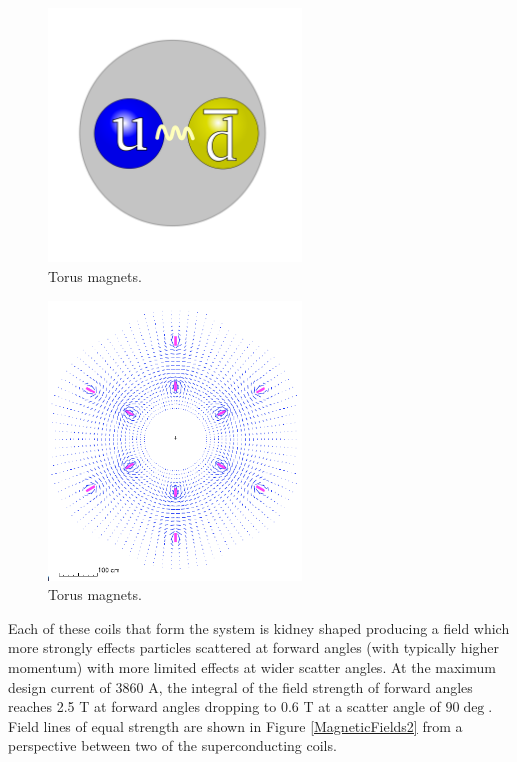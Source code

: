 \begin{figure}
	\centering
	\includegraphics[width=0.6\textwidth]{ImgChap1/meson2}
	\caption{Torus magnets.}
	\label{CLAStorus}
\end{figure}

\begin{figure}
	\centering
	\includegraphics[width=0.6\textwidth]{ImgChap1/mag}
	\caption{Torus magnets.}
	\label{MagneticFields1}
\end{figure}

Each of these coils that form the system is kidney shaped producing a field which more strongly effects particles scattered at forward angles (with typically higher momentum) with more limited effects at wider scatter angles. At the maximum design current of 3860 A, the integral of the field strength of forward angles reaches 2.5 T at forward angles dropping to 0.6 T at a scatter angle of $90\deg$. Field lines of equal strength are shown in Figure \ref{MagneticFields2} from a perspective between two of the superconducting coils.


